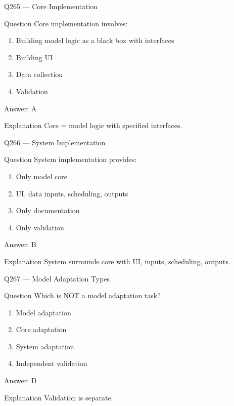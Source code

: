\documentclass[aspectratio=169,8pt]{beamer}
\begin{document}
\begin{frame}{Q265 --- Core Implementation}
\begin{block}{Question}
Core implementation involves:
\begin{enumerate}
\item Building model logic as a black box with interfaces
\item Building UI
\item Data collection
\item Validation
\end{enumerate}
\end{block}
\begin{exampleblock}{Answer: A}\end{exampleblock}
\begin{block}{Explanation}
Core = model logic with specified interfaces.
\end{block}
\end{frame}

\begin{frame}{Q266 --- System Implementation}
\begin{block}{Question}
System implementation provides:
\begin{enumerate}
\item Only model core
\item UI, data inputs, scheduling, outputs
\item Only documentation
\item Only validation
\end{enumerate}
\end{block}
\begin{exampleblock}{Answer: B}\end{exampleblock}
\begin{block}{Explanation}
System surrounds core with UI, inputs, scheduling, outputs.
\end{block}
\end{frame}

\begin{frame}{Q267 --- Model Adaptation Types}
\begin{block}{Question}
Which is NOT a model adaptation task?
\begin{enumerate}
\item Model adaptation
\item Core adaptation
\item System adaptation
\item Independent validation
\end{enumerate}
\end{block}
\begin{exampleblock}{Answer: D}\end{exampleblock}
\begin{block}{Explanation}
Validation is separate.
\end{block}
\end{frame}
\end{document}
